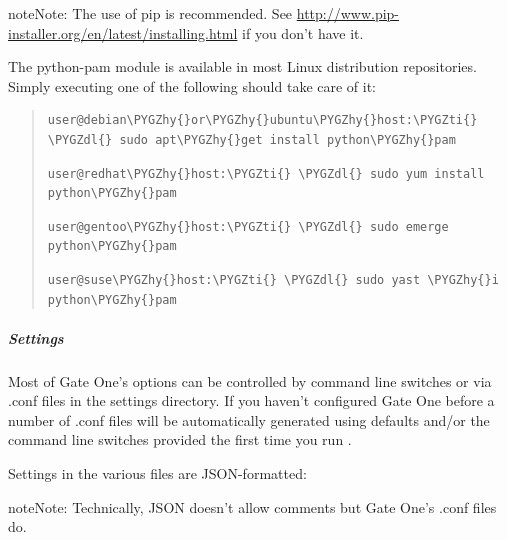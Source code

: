 \documentclass[letterpaper,10pt,openany]{sphinxmanual}
\def\PYGZdl{\char`\$}
\def\PYGZhy{\char`\-}
\def\PYGZti{\char`\~}
\begin{document}
\begin{notice}{note}{Note:}
The use of pip is recommended.  See \href{http://www.pip-installer.org/en/latest/installing.html}{http://www.pip-installer.org/en/latest/installing.html} if you don't have it.
\end{notice}

The python-pam module is available in most Linux distribution repositories.  Simply executing one of the following should take care of it:
\begin{quote}

\begin{Verbatim}[commandchars=\\\{\}]
user@debian\PYGZhy{}or\PYGZhy{}ubuntu\PYGZhy{}host:\PYGZti{} \PYGZdl{} sudo apt\PYGZhy{}get install python\PYGZhy{}pam
\end{Verbatim}

\begin{Verbatim}[commandchars=\\\{\}]
user@redhat\PYGZhy{}host:\PYGZti{} \PYGZdl{} sudo yum install python\PYGZhy{}pam
\end{Verbatim}

\begin{Verbatim}[commandchars=\\\{\}]
user@gentoo\PYGZhy{}host:\PYGZti{} \PYGZdl{} sudo emerge python\PYGZhy{}pam
\end{Verbatim}

\begin{Verbatim}[commandchars=\\\{\}]
user@suse\PYGZhy{}host:\PYGZti{} \PYGZdl{} sudo yast \PYGZhy{}i python\PYGZhy{}pam
\end{Verbatim}
\end{quote}


\subparagraph{Settings}
\label{Developer/server:settings}
Most of Gate One's options can be controlled by command line switches or via
.conf files in the settings directory.  If you haven't configured Gate One
before a number of .conf files will be automatically generated using defaults
and/or the command line switches provided the first time you run .

Settings in the various  files are JSON-formatted:

\begin{notice}{note}{Note:}
Technically, JSON doesn't allow comments but Gate One's .conf files do.
\end{notice}
\end{document}
